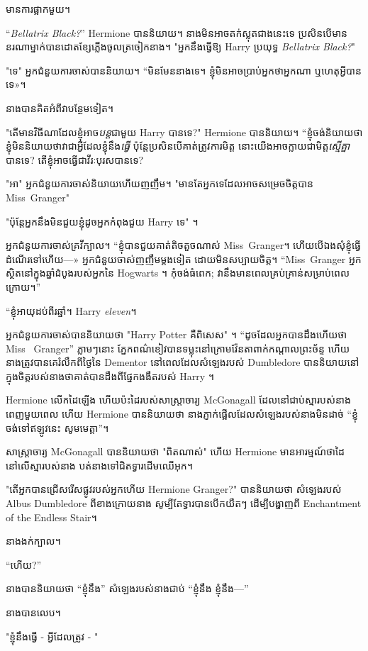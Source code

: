 {{មានការផ្អាកមួយ។

“\emph{Bellatrix Black?}” Hermione បាននិយាយ។ នាង​មិន​អាច​តក់​ស្លុត​ជាង​នេះ​ទេ ប្រសិន​បើ​មាន​នរណា​ម្នាក់​បាន​ដោត​ខ្សែ​ភ្លើង​ចូល​ត្រចៀក​នាង។ "អ្នកនឹងធ្វើឱ្យ Harry ប្រយុទ្ធ \emph{Bellatrix Black?}"

"ទេ" អ្នកជំនួយការចាស់បាននិយាយ។ “មិនមែននាងទេ។ ខ្ញុំ​មិន​អាច​ប្រាប់​អ្នក​ថា​អ្នក​ណា ឬ​ហេតុ​អ្វី​បាន​ទេ»។

នាងបានគិតអំពីវាបន្ថែមទៀត។

"តើមានវិធីណាដែលខ្ញុំអាច\emph{បន្ត}ជាមួយ Harry បានទេ?" Hermione បាននិយាយ។ “ខ្ញុំចង់និយាយថា ខ្ញុំមិននិយាយថាវាជាអ្វីដែលខ្ញុំនឹង\emph{ធ្វើ} ប៉ុន្តែប្រសិនបើគាត់ត្រូវការមិត្ត នោះយើងអាចក្លាយជាមិត្ត\emph{ស្មើគ្នា}បានទេ? តើខ្ញុំអាចធ្វើជាវីរៈបុរសបានទេ?

"អា" អ្នកជំនួយការចាស់និយាយហើយញញឹម។ "មានតែអ្នកទេដែលអាចសម្រេចចិត្តបាន Miss~Granger"

"ប៉ុន្តែអ្នកនឹងមិនជួយខ្ញុំដូចអ្នកកំពុងជួយ Harry ទេ" ។

អ្នកជំនួយការចាស់គ្រវីក្បាល។ “ខ្ញុំបានជួយគាត់តិចតួចណាស់ Miss~Granger។ ហើយ​បើ​ឯង​សុំ​ខ្ញុំ​ធ្វើ​ដំណើរ​ទៅ​ហើយ—» អ្នក​ជំនួយ​ចាស់​ញញឹម​ម្ដង​ទៀត ដោយ​មិន​សប្បាយ​ចិត្ត។ “Miss~Granger អ្នកស្ថិតនៅក្នុងឆ្នាំដំបូងរបស់អ្នកនៃ Hogwarts ។ កុំចង់ធំពេក; វានឹងមានពេលគ្រប់គ្រាន់សម្រាប់ពេលក្រោយ។”

“ខ្ញុំ​អាយុ​ដប់ពីរ​ឆ្នាំ។ Harry \emph{eleven}។

អ្នកជំនួយការចាស់បាននិយាយថា "Harry Potter គឺពិសេស" ។ “ដូចដែលអ្នកបានដឹងហើយថា Miss ~Granger” ភ្លាមៗនោះ ភ្នែកពណ៌ខៀវបានទម្លុះនៅក្រោមវ៉ែនតាពាក់កណ្តាលព្រះច័ន្ទ ហើយនាងត្រូវបានគេរំលឹកពីថ្ងៃនៃ Dementor នៅពេលដែលសំឡេងរបស់ Dumbledore បាននិយាយនៅក្នុងចិត្តរបស់នាងថាគាត់បានដឹងពីផ្នែកងងឹតរបស់ Harry ។

Hermione លើកដៃឡើង ហើយប៉ះដៃរបស់សាស្រ្តាចារ្យ McGonagall ដែលនៅជាប់ស្មារបស់នាងពេញមួយពេល ហើយ Hermione បាននិយាយថា នាងភ្ញាក់ផ្អើលដែលសំឡេងរបស់នាងមិនដាច់ “ខ្ញុំចង់ទៅឥឡូវនេះ សូមមេត្តា”។

សាស្រ្តាចារ្យ McGonagall បាននិយាយថា "ពិតណាស់" ហើយ Hermione មានអារម្មណ៍ថាដៃនៅលើស្មារបស់នាង បត់នាងទៅជិតទ្វារដើមឈើអុក។

"តើអ្នកបានជ្រើសរើសផ្លូវរបស់អ្នកហើយ Hermione Granger?" បាននិយាយថា សំឡេងរបស់ Albus Dumbledore ពីខាងក្រោយនាង សូម្បីតែទ្វារបានបើកយឺតៗ ដើម្បីបង្ហាញពី Enchantment of the Endless Stair។

នាងងក់ក្បាល។

“ហើយ?”

នាងបាននិយាយថា “ខ្ញុំនឹង” សំឡេងរបស់នាងជាប់ “ខ្ញុំនឹង ខ្ញុំនឹង—”

នាងបានលេប។

"ខ្ញុំនឹងធ្វើ - អ្វីដែលត្រូវ - "

}}

